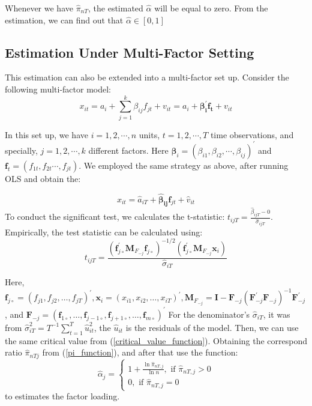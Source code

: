 \documentclass[12pt]{article}
\begin{document}
Whenever we have $\hat{\pi}_{nT}$, the estimated $\hat{\alpha}$ will be equal to zero. 
From the estimation, we can find out that $\hat{\alpha} \in [0,1]$

\subsection{Estimation Under Multi-Factor Setting}

This estimation can also be extended into a multi-factor set up.
Consider the following multi-factor model:
\[x_{it} = a_i +\sum_{j = 1}^k\beta_{ij}f_{jt} +v_{it} = a_i + \mathbf{\beta^{\prime}_{i}f_{t}} +v_{it} \]

In this set up, we have $i = 1, 2, \cdots, n$ units, $t = 1, 2, \cdots, T$ time observations, and specially, $j = 1, 2,\cdots, k$ different factors.
Here $\mathbf{\beta}_{i} = (\beta_{i1}, \beta_{i2}, \cdots, \beta_{ij})^{\prime} $ and $\mathbf{f}_t = (f_{1t}, f_{2t}\cdots, f_{jt})$.
We employed the same strategy as above, after running OLS and obtain the:

\[ x_{it} =\hat{a}_{iT} + \mathbf{\hat{\beta}_{ij}}\mathbf{f}_{jt} + \hat{v}_{it}    \]
To conduct the significant test, we calculates the t-statistic: $t_{ijT} = \frac{\hat{\beta}_{ijT}-0}{\hat{\sigma}_{ijT}}$. Empirically, the test statistic can be calculated using:
\[ t_{i j T}=\frac{\left(\mathbf{f}_{j \circ}^{\prime} \mathbf{M}_{F_{-j}} \mathbf{f}_{j \circ}\right)^{-1 / 2}\left(\mathbf{f}_{j \circ}^{\prime} \mathbf{M}_{F_{-j}} \mathbf{x}_{i}\right)}{\hat{\sigma}_{i T}} \]

Here, $\mathbf{f}_{j \circ}=\left(f_{j 1}, f_{j 2}, \ldots, f_{j T}\right)^{\prime}, \mathbf{x}_{i}=\left(x_{i 1}, x_{i 2}, \ldots, x_{i T}\right)^{\prime}, \mathbf{M}_{F_{-j}}=\mathbf{I}-\mathbf{F}_{-j}\left(\mathbf{F}_{-j}^{\prime} \mathbf{F}_{-j}\right)^{-1} \mathbf{F}_{-j}^{\prime}$, and $\mathbf{F}_{-j}=\left(\mathbf{f}_{1 \circ}, \ldots, \mathbf{f}_{j-1 \circ}, \mathbf{f}_{j+1 \circ}, \ldots, \mathbf{f}_{m \circ}\right)^{\prime}$
For the denominator's $\hat{\sigma}_{iT}$, it was from $\hat{\sigma}_{i T}^{2}=T^{-1} \sum_{t=1}^{T} \hat{u}_{i t}^{2}$, the $\hat{u}_{it}$ is the residuals of the model.
Then, we can use the same critical value from (\ref{critical_value_function}).
Obtaining the correspond ratio $\hat{\pi}_{nTj}$  from (\ref{pi_function}), and after that use the function:
\begin{equation*}
\hat{\alpha}_{j}=\left\{\begin{array}{l}
1+\frac{\ln \hat{\pi}_{n T, j}}{\ln n}, \text { if } \hat{\pi}_{n T, j}>0 \\
0, \text { if } \hat{\pi}_{n T, j}=0
\end{array}\right.
\end{equation*}
to estimates the factor loading.
\end{document}
